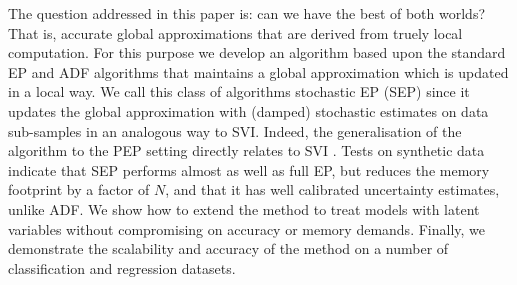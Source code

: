 The question addressed in this paper is: can we have the best of both worlds? That is, accurate global approximations that are derived from truely local computation. For this purpose we develop an algorithm based upon the standard EP and ADF algorithms that maintains a global approximation which is updated in a local way. We call this class of algorithms stochastic EP (SEP) since it updates the global approximation with (damped) stochastic estimates on data sub-samples in an analogous way to SVI. Indeed, the generalisation of the algorithm to the PEP setting directly relates to SVI \cite{hoffman:svi}. Tests on synthetic data indicate that SEP performs almost as well as full EP, but reduces the memory footprint by a factor of $N$, and that it has well calibrated uncertainty estimates, unlike ADF. We show how to extend the method to treat models with latent variables without compromising on accuracy or memory demands. Finally, we demonstrate the scalability and accuracy of the method on a number of classification and regression datasets.



